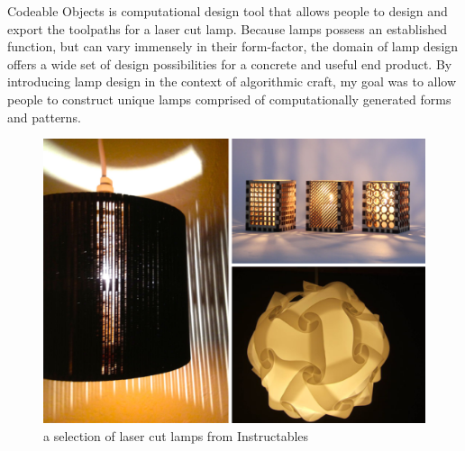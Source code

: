 Codeable Objects is computational design tool that allows people to design and export the toolpaths for a laser cut lamp. Because lamps possess an established function, but can vary immensely in their form-factor, the domain of lamp design offers a wide set of design possibilities for a concrete and useful end product. By introducing lamp design in the context of algorithmic craft, my goal was to allow people to construct unique lamps comprised of computationally generated forms and patterns. 
\begin{center}
\begin{figure}[h!]
\includegraphics[width=6.5in]{images/instructables_lamps.png}
\caption{a selection of laser cut lamps from Instructables}
\end{figure}
\end{center}
